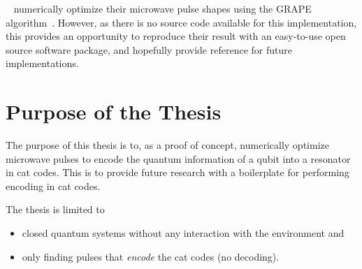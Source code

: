 \documentclass[main.tex]{subfiles}
\begin{document}
~\citeauthor{ofek_extending_2016} numerically optimize their microwave pulse shapes using the GRAPE algorithm~\cite{khaneja_optimal_2005}. However, as there is no source code available for this implementation, this provides an opportunity to reproduce their result with an easy-to-use open source software package, and hopefully provide reference for future implementations.

\newpage
\section{Purpose of the Thesis}%
\label{sec:purpose}
The purpose of this thesis is to, as a proof of concept, numerically optimize microwave pulses to encode the quantum information of a qubit into a resonator in cat codes.
This is to provide future research with a boilerplate for performing encoding in cat codes.

The thesis is limited to
\begin{itemize}
    \item closed quantum systems without any interaction with the environment and
    \item only finding pulses that \emph{encode} the cat codes (no decoding).
\end{itemize}
\end{document}
